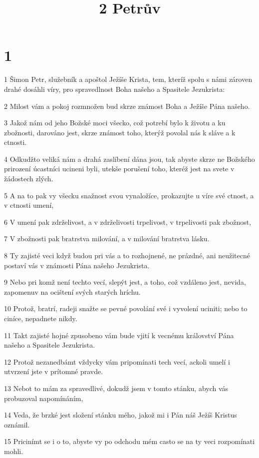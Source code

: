 

\title{2 Petrův}

\chapter{1}

\par 1 Šimon Petr, služebník a apoštol Ježíše Krista, tem, kteríž spolu s námi zároven drahé dosáhli víry, pro spravedlnost Boha našeho a Spasitele Jezukrista:
\par 2 Milost vám a pokoj rozmnožen bud skrze známost Boha a Ježíše Pána našeho.
\par 3 Jakož nám od jeho Božské moci všecko, což potrebí bylo k životu a ku zbožnosti, darováno jest, skrze známost toho, kterýž povolal nás k sláve a k ctnosti.
\par 4 Odkudžto veliká nám a drahá zaslíbení dána jsou, tak abyste skrze ne Božského prirození úcastníci ucineni byli, utekše porušení toho, kteréž jest na svete v žádostech zlých.
\par 5 A na to pak vy všecku snažnost svou vynaložíce, prokazujte u víre své ctnost, a v ctnosti umení,
\par 6 V umení pak zdrželivost, a v zdrželivosti trpelivost, v trpelivosti pak zbožnost,
\par 7 V zbožnosti pak bratrstva milování, a v milování bratrstva lásku.
\par 8 Ty zajisté veci když budou pri vás a to rozhojnené, ne prázdné, ani neužitecné postaví vás v známosti Pána našeho Jezukrista.
\par 9 Nebo pri komž není techto vecí, slepýt jest, a toho, což vzdáleno jest, nevida, zapomenuv na ocištení svých starých hríchu.
\par 10 Protož, bratrí, radeji snažte se pevné povolání své i vyvolení uciniti; nebo to ciníce, nepadnete nikdy.
\par 11 Takt zajisté hojné zpusobeno vám bude vjití k vecnému království Pána našeho a Spasitele Jezukrista.
\par 12 Protož nezanedbámt vždycky vám pripomínati tech vecí, ackoli umelí i utvrzení jste v prítomné pravde.
\par 13 Nebot to mám za spravedlivé, dokudž jsem v tomto stánku, abych vás probuzoval napomínáním,
\par 14 Veda, že brzké jest složení stánku mého, jakož mi i Pán náš Ježíš Kristus oznámil.
\par 15 Pricinímt se i o to, abyste vy po odchodu mém casto se na ty veci rozpomínati mohli.
